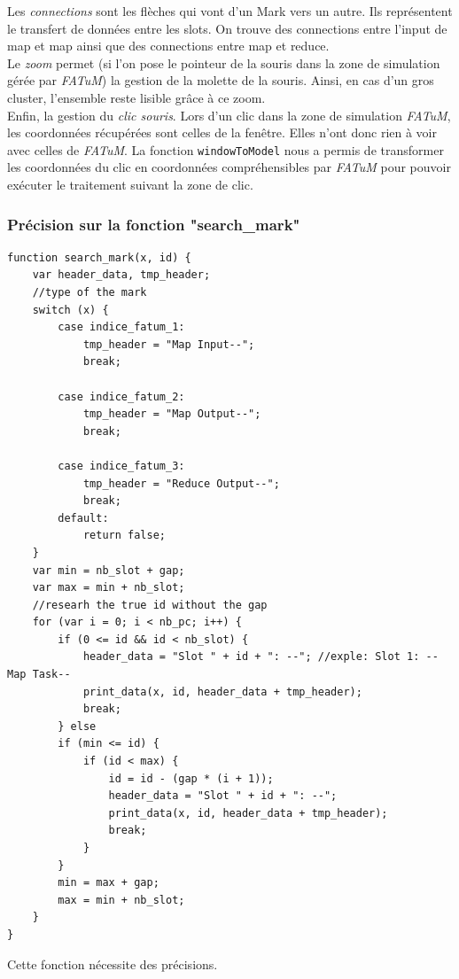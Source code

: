 Les {\it connections} sont les flèches qui vont d'un Mark vers un autre. Ils représentent le transfert de données entre les slots. On trouve des connections entre l'input de map et map ainsi que des connections entre map et reduce.\\

Le {\it zoom} permet (si l'on pose le pointeur de la souris dans la zone de simulation gérée par \textit{FATuM}) la gestion de la molette de la souris. Ainsi, en cas d'un gros cluster, l'ensemble reste lisible grâce à ce zoom. \\

Enfin, la gestion du {\it clic souris}. Lors d'un clic dans la zone de simulation \textit{FATuM}, les coordonnées récupérées sont celles de la fenêtre. Elles n'ont donc rien à voir avec celles de \textit{FATuM}. La fonction {\tt windowToModel} nous a permis de transformer les coordonnées du clic en coordonnées compréhensibles par \textit{FATuM} pour pouvoir exécuter le traitement suivant la zone de clic.


\subsubsection{Précision sur la fonction "search\_mark"}

\begin{lstlisting}
function search_mark(x, id) {
    var header_data, tmp_header;
    //type of the mark
    switch (x) {
        case indice_fatum_1:
            tmp_header = "Map Input--";
            break;

        case indice_fatum_2:
            tmp_header = "Map Output--";
            break;

        case indice_fatum_3:
            tmp_header = "Reduce Output--";
            break;
        default:
            return false;
    }
    var min = nb_slot + gap;
    var max = min + nb_slot;
    //researh the true id without the gap
    for (var i = 0; i < nb_pc; i++) {
        if (0 <= id && id < nb_slot) {
            header_data = "Slot " + id + ": --"; //exple: Slot 1: --Map Task--
            print_data(x, id, header_data + tmp_header);
            break;
        } else
        if (min <= id) {
            if (id < max) {
                id = id - (gap * (i + 1));
                header_data = "Slot " + id + ": --";
                print_data(x, id, header_data + tmp_header);
                break;
            }
        }
        min = max + gap;
        max = min + nb_slot;
    }
}
\end{lstlisting}
\newpage
Cette fonction nécessite des précisions. 

